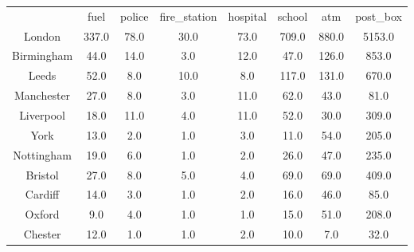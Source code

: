 \begin{tabular}{cccccccc}
\hline
& fuel & police & fire_station & hospital & school & atm & post_box \\
London & 337.0 & 78.0 & 30.0 & 73.0 & 709.0 & 880.0 & 5153.0 \\
Birmingham & 44.0 & 14.0 & 3.0 & 12.0 & 47.0 & 126.0 & 853.0 \\
Leeds & 52.0 & 8.0 & 10.0 & 8.0 & 117.0 & 131.0 & 670.0 \\
Manchester & 27.0 & 8.0 & 3.0 & 11.0 & 62.0 & 43.0 & 81.0 \\
Liverpool & 18.0 & 11.0 & 4.0 & 11.0 & 52.0 & 30.0 & 309.0 \\
York & 13.0 & 2.0 & 1.0 & 3.0 & 11.0 & 54.0 & 205.0 \\
Nottingham & 19.0 & 6.0 & 1.0 & 2.0 & 26.0 & 47.0 & 235.0 \\
Bristol & 27.0 & 8.0 & 5.0 & 4.0 & 69.0 & 69.0 & 409.0 \\
Cardiff & 14.0 & 3.0 & 1.0 & 2.0 & 16.0 & 46.0 & 85.0 \\
Oxford & 9.0 & 4.0 & 1.0 & 1.0 & 15.0 & 51.0 & 208.0 \\
Chester & 12.0 & 1.0 & 1.0 & 2.0 & 10.0 & 7.0 & 32.0 \\
\hline
\end{tabular}
